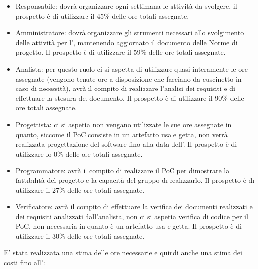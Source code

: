 \begin{itemize}
\item Responsabile: dovrà organizzare ogni settimana le attività da svolgere, il prospetto è di utilizzare il 45\% delle ore totali assegnate.
\item Amministratore: dovrà organizzare gli strumenti necessari allo svolgimento delle attività per l', mantenendo aggiornato il documento delle Norme di progetto.
Il prospetto è di utilizzare il 59\% delle ore totali assegnate.
\item Analista: per questo ruolo ci si aspetta di utilizzare quasi interamente le ore assegnate (vengono tenute ore a disposizione che facciano da cuscinetto in caso di necessità), avrà il compito di realizzare l'analisi dei requisiti e di effettuare la stesura del documento.
Il prospetto è di utilizzare il 90\% delle ore totali assegnate.
\item Progettista: ci si aspetta non vengano utilizzate le sue ore assegnate in quanto, siccome il PoC consiste in un artefatto usa e getta, non verrà realizzata progettazione del software fino alla data dell'.
Il prospetto è di utilizzare lo 0\% delle ore totali assegnate.
\item Programmatore: avrà il compito di realizzare il PoC per dimostrare la fattibilità del progetto e la capacità del gruppo di realizzarlo.
Il prospetto è di utilizzare il 27\% delle ore totali assegnate.
\item Verificatore: avrà il compito di effettuare la verifica dei documenti realizzati e dei requisiti analizzati dall'analista, non ci si aspetta verifica di codice per il PoC, non necessaria in quanto è un artefatto usa e getta.
Il prospetto è di utilizzare il 30\% delle ore totali assegnate.
\end{itemize}
E' stata realizzata una stima delle ore necessarie e quindi anche una stima dei costi fino all':
\begin{table}[H]
    \centering
    \caption{Ripartizione ore e costi fino .}
    \label{tab:stima_costi_RTB} 
\end{table}

